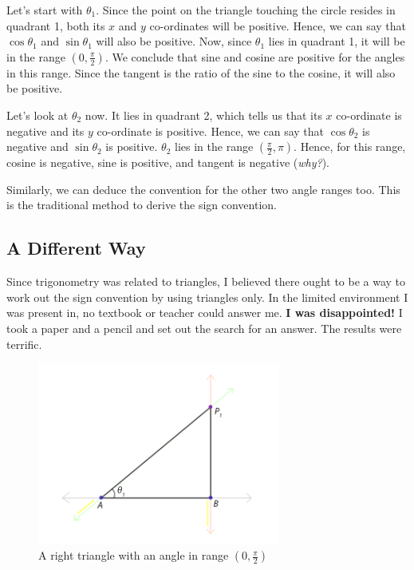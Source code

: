 \documentclass{article}
\begin{document}
Let's start with $\theta_1$. Since the point on the triangle touching the circle resides in quadrant 1, both its $x$ and $y$ co-ordinates will be positive. Hence, we can say that $\cos\theta_1$ and $\sin\theta_1$ will also be positive. Now, since $\theta_1$ lies in quadrant 1, it will be in the range $(0,\frac{\pi}{2})$. We conclude that sine and cosine are positive for the angles in this range. Since the tangent is the ratio of the sine to the cosine, it will also be positive.

Let's look at $\theta_2$ now. It lies in quadrant 2, which tells us that its $x$ co-ordinate is negative and its $y$ co-ordinate is positive. Hence, we can say that $\cos\theta_2$ is negative and $\sin\theta_2$ is positive. $\theta_2$ lies in the range $(\frac{\pi}{2},\pi)$. Hence, for this range, cosine is negative, sine is positive, and tangent is negative (\textit{why?}).

Similarly, we can deduce the convention for the other two angle ranges too. This is the traditional method to derive the sign convention.

\subsection{A Different Way}

Since trigonometry was related to triangles, I believed there ought to be a way to work out the sign convention by using triangles only. In the limited environment I was present in, no textbook or teacher could answer me. \textbf{I was disappointed!} I took a paper and a pencil and set out the search for an answer. The results were terrific.

\begin{figure}[!h]
    \centering
    \includegraphics[width=8cm]{triangle1}
    \caption{A right triangle with an angle in range $(0, \frac{\pi}{2})$}
    \label{fig:tri1}
\end{figure}
\end{document}
